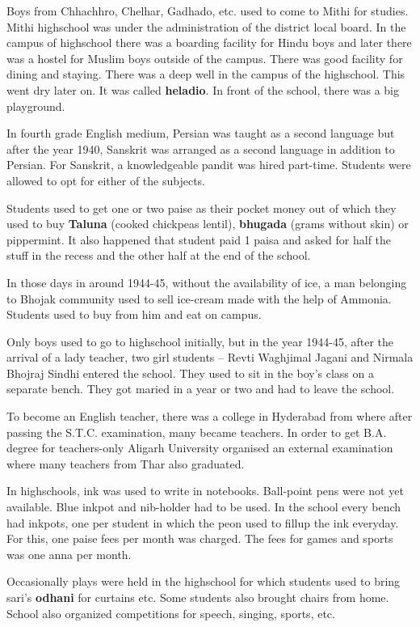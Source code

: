 Boys from Chhachhro, Chelhar, Gadhado, etc. used to come to Mithi for studies.
Mithi highschool was under the administration of the district local board. In
the campus of highschool there was a boarding facility for Hindu boys and later
there was a hostel for Muslim boys outside of the campus. There was good
facility for dining and staying. There was a deep well in the campus of the
highschool. This went dry later on. It was called \textbf{heladio}. In front of
the school, there was a big playground. 

In fourth grade English medium, Persian was taught as a second language but
after the year 1940, Sanskrit was arranged as a second language in addition to
Persian. For Sanskrit, a knowledgeable pandit was hired part-time. Students
were allowed to opt for either of the subjects. 

Students used to get one or two paise as their pocket money out of which they
used to buy \textbf{Taluna} (cooked chickpeas lentil), \textbf{bhugada} (grams
without skin) or pippermint. It also happened that student paid 1 paisa and
asked for half the stuff in the recess and  the other half at the end of the
school.  

In those days in around 1944-45, without the availability of ice, a man
belonging to Bhojak community used to sell ice-cream made with the help of
Ammonia. Students used to buy from him and eat on campus.

Only boys used to go to highschool initially, but in the year 1944-45, after the
arrival of a lady teacher, two girl students -- Revti Waghjimal Jagani and
Nirmala Bhojraj Sindhi entered the school. They used to sit in the boy's class
on a separate bench. They got maried in a year or two and had to leave the
school.

To become an English teacher, there was a college in Hyderabad from where after
passing the S.T.C. examination, many became teachers. In order to get B.A.
degree for teachers-only Aligarh University organised an external examination
where many teachers from Thar also graduated.

In highschools, ink was used to write in notebooks. Ball-point pens were not yet
available. Blue inkpot and nib-holder had to be used. In the school every bench
had inkpots, one per student in which the peon used to fillup the ink everyday.
For this, one paise fees per month was charged. The fees for games and sports
was one anna per month. 

Occasionally plays were held in the highschool for which students used to bring
sari's \textbf{odhani} for curtains etc. Some students also brought chairs from
home. School also organized competitions for speech, singing, sports, etc.

